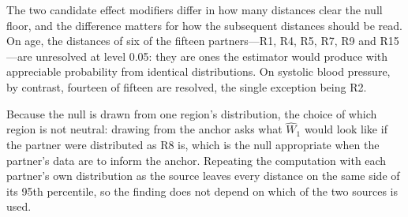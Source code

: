 \documentclass[AMA,Times1COL]{WileyNJDv5}
\begin{document}
The two candidate effect modifiers differ in how many distances clear the null floor, and the difference matters for how the subsequent distances should be read. On age, the distances of six of the fifteen partners---R1, R4, R5, R7, R9 and R15---are unresolved at level 0.05: they are ones the estimator would produce with appreciable probability from identical distributions. On systolic blood pressure, by contrast, fourteen of fifteen are resolved, the single exception being R2.

Because the null is drawn from one region's distribution, the choice of which region is not neutral: drawing from the anchor asks what $\widehat{W}_1$ would look like if the partner were distributed as R8 is, which is the null appropriate when the partner's data are to inform the anchor. Repeating the computation with each partner's own distribution as the source leaves every distance on the same side of its 95th percentile, so the finding does not depend on which of the two sources is used.
\end{document}
